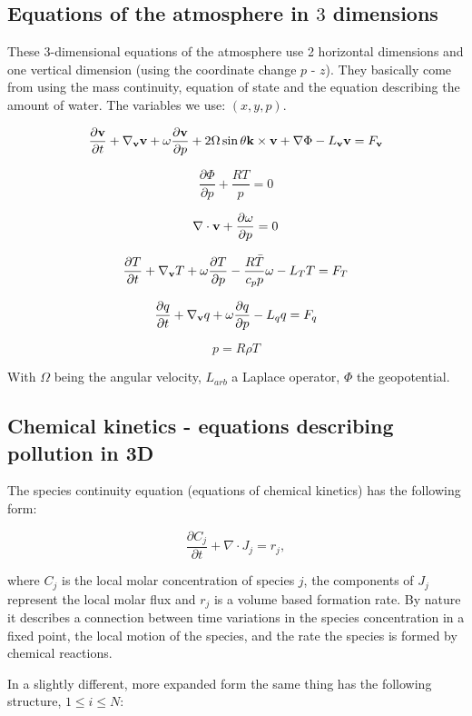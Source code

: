 \documentclass{article}
\begin{document}
\subsection{Equations of the atmosphere in $3$ dimensions}

These 3-dimensional equations of the atmosphere use 2 horizontal dimensions and one vertical dimension (using the coordinate change $p$ - $z$). They basically come from using the mass continuity, equation of state and the equation describing the amount of water. The variables we use: $(x,y,p)$.

\[ \frac{\partial \bold{v}}{\partial t} + \nabla_{\bold{v}}\bold{v} + \omega \frac{\partial \bold{v}}{\partial p} + 2 \Omega \sin \theta \bold{k} \times \bold{v} + \nabla \Phi -L_{\bold{v}} \bold{v} = F_\bold{v}  \]

\[ \frac{\partial \Phi}{\partial p} + \frac{RT}{p} = 0 \]

\[ \nabla \cdot \bold{v} + \frac{\partial \omega}{\partial p} = 0\]

\[ \frac{\partial T}{\partial t} + \nabla_{\bold{v}} T + \omega \frac{\partial T}{\partial p} - \frac{R \bar{T}}{c_p p} \omega - L_T T = F_T\]

\[ \frac{\partial q}{\partial t} + \nabla_{\bold{v}}q + \omega \frac{\partial q}{\partial p} -L_q q = F_q \]

\[ p = R \rho T\]

With $\Omega$ being the angular velocity, $L_{arb}$ a Laplace operator, $\Phi$ the geopotential.

\subsection{Chemical kinetics - equations describing pollution in 3D}

The species continuity equation (equations of chemical kinetics) has the following form:

\[ \frac{\partial C_j}{\partial t} + \nabla \cdot J_j = r_j,\]

where $C_j$ is the local molar concentration of species $j$, the components of $J_j$ represent the local molar flux and $r_j$ is a volume based formation rate. By nature it describes a connection between time variations in the species concentration in a fixed point, the local motion of the species, and the rate the species is formed by chemical reactions.

In a slightly different, more expanded form the same thing has the following structure, $1 \leq i \leq N$:
\end{document}
